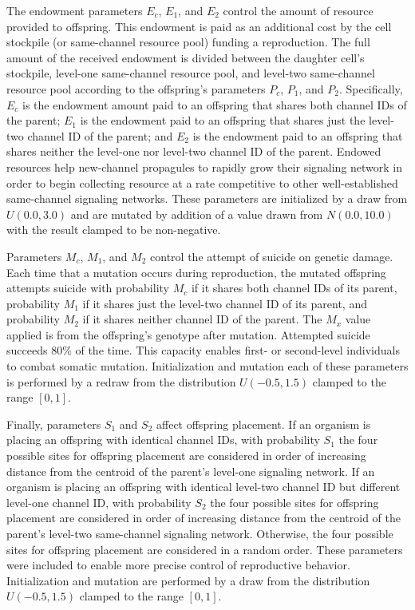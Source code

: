 The endowment parameters $E_{c}$, $E_1$, and $E_2$ control the amount of resource provided to offspring.
This endowment is paid as an additional cost by the cell stockpile (or same-channel resource pool) funding a reproduction.
The full amount of the received endowment is divided between the daughter cell's stockpile, level-one same-channel resource pool, and level-two same-channel resource pool according to the offspring's parameters $P_{c}$, $P_1$, and $P_2$.
Specifically, $E_{c}$ is the endowment amount paid to an offspring that shares both channel IDs of the parent;
$E_1$ is the endowment paid to an offspring that shares just the level-two channel ID of the parent;
and $E_2$ is the endowment paid to an offspring that shares neither the level-one nor level-two channel ID of the parent.
Endowed resources help new-channel propagules to rapidly grow their signaling network in order to begin collecting resource at a rate competitive to other well-established same-channel signaling networks.
These parameters are initialized by a draw from $U(0.0, 3.0)$ and are mutated by addition of a value drawn from $N(0.0,10.0)$ with the result clamped to be non-negative.

Parameters $M_{c}$, $M_1$, and $M_2$ control the attempt of suicide on genetic damage.
Each time that a mutation occurs during reproduction, the mutated offspring attempts suicide with probability $M_{c}$ if it shares both channel IDs of its parent, probability $M_1$ if it shares just the level-two channel ID of its parent, and probability $M_2$ if it shares neither channel ID of the parent.
The $M_x$ value applied is from the offspring's genotype after mutation.
Attempted suicide succeeds 80\% of the time.
This capacity enables first- or second-level individuals to combat somatic mutation.
Initialization and mutation each of these parameters is performed by a redraw from the distribution $U(-0.5,1.5)$ clamped to the range $[0,1]$.

Finally, parameters $S_1$ and $S_2$ affect offspring placement.
If an organism is placing an offspring with identical channel IDs, with probability $S_1$ the four possible sites for offspring placement are considered in order of increasing distance from the centroid of the parent's level-one signaling network.
If an organism is placing an offspring with identical level-two channel ID but different level-one channel ID, with probability $S_2$ the four possible sites for offspring placement are considered in order of increasing distance from the centroid of the parent's level-two same-channel signaling network.
Otherwise, the four possible sites for offspring placement are considered in a random order.
These parameters were included to enable more precise control of reproductive behavior.
Initialization and mutation are performed by a draw from the distribution $U(-0.5,1.5)$ clamped to the range $[0,1]$.

